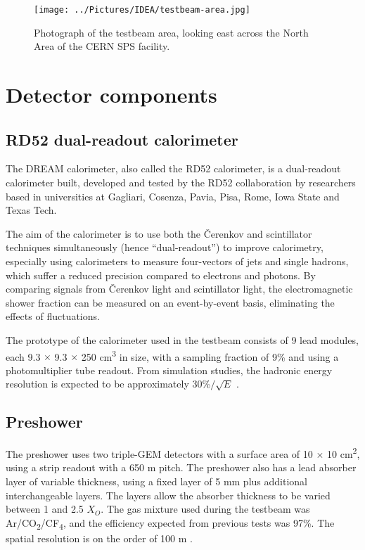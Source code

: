 \begin{figure}[hp]
	\centering
	\texttt{[image: ../Pictures/IDEA/testbeam-area.jpg]}
	\caption{Photograph of the testbeam area, looking east across the North Area of the \acrshort{CERN} \acrshort{SPS} facility.}
	\label{figure:idea/testbeam-photo}
\end{figure}

\section{Detector components}

\subsection{RD52 dual-readout calorimeter} %
The \acrfull{DREAM} calorimeter, also called the RD52 calorimeter, is a dual-readout calorimeter built, developed and tested by the RD52 collaboration by researchers based in universities at Gagliari, Cosenza, Pavia, Pisa, Rome, Iowa State and Texas Tech. 

The aim of the calorimeter is to use both the \v{C}erenkov and scintillator techniques simultaneously (hence ``dual-readout'') to improve calorimetry, especially using calorimeters to measure four-vectors of jets and single hadrons, which suffer a reduced precision compared to electrons and photons. By comparing signals from \v{C}erenkov light and scintillator light, the electromagnetic shower fraction can be measured on an event-by-event basis, eliminating the effects of fluctuations. %

The prototype of the calorimeter used in the testbeam consists of 9 lead modules, each 9.3 $\times$ 9.3 $\times$ 250 cm\textsuperscript{3} in size, with a sampling fraction of 9\% and using a photomultiplier tube readout. From simulation studies, the hadronic energy resolution is expected to be approximately 30\%$/\sqrt{E}$ \cite{idea-dual-readout} \cite{idea-rd52}.

\subsection{Preshower}
The preshower uses two triple-GEM detectors with a surface area of 10 $\times$ 10 cm\textsuperscript{2}, using a strip readout with a 650 \textmu m pitch. The preshower also has a lead absorber layer of variable thickness, using a fixed layer of 5 mm plus additional interchangeable layers. The layers allow the absorber thickness to be varied between 1 and 2.5 $X_O$. The gas mixture used during the testbeam was Ar/CO\textsubscript{2}/CF\textsubscript{4}, and the efficiency expected from previous tests was 97\%. The spatial resolution is on the order of 100 \textmu m \cite{idea-gem}.

